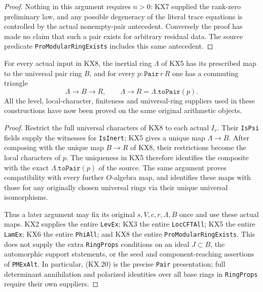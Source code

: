 \begin{proof}
Nothing in this argument requires $n>0$: KX7 supplied the
rank-zero preliminary law, and any possible degeneracy of the
literal trace equations is controlled by the actual nonempty-pair
antecedent.  Conversely the proof has made no claim that such
a pair exists for arbitrary residual data.  The source predicate
\texttt{ProModularRingExists} includes this same antecedent.
\end{proof}

\begin{corollary}
\label{claim:KX9}
For every actual input in KX8, the inertial ring $\Lambda$ of KX5
has its prescribed map to the universal pair ring $B$, and for
every $p:\texttt{Pair}\,r\,R$ one has a commuting triangle
\[
                    \Lambda\longrightarrow B\longrightarrow R,
 \qquad \Lambda\longrightarrow R
                         =\Lambda.\texttt{toPair}(p).
                                                               \tag{KX.22}
\]
All the level, local-character, finiteness and universal-ring
suppliers used in these constructions have now been proved on
the same original arithmetic objects.
\end{corollary}
\begin{proof}
Restrict the full universal characters of KX8 to each actual
$I_v$.  Their \texttt{IsPsi} fields supply the witnesses for
\texttt{IsInert}; KX5 gives a unique map $\Lambda\to B$.
After composing with the unique map $B\to R$ of KX8, their
restrictions become the local characters of $p$.  The uniqueness
in KX5 therefore identifies the composite with the exact
$\Lambda.\texttt{toPair}(p)$ of the source.  The same argument
proves compatibility with every further $O$-algebra map, and
identifies these maps with those for any originally chosen
universal rings via their unique universal isomorphisms.

Thus a later argument may fix its original $s,V,c,r,\Lambda,B$
once and use these actual maps.  KX2 supplies the entire
\texttt{LevEx}; KX3 the entire \texttt{LocCFTAll}; KX5 the
entire \texttt{LamEx}; KX6 the entire \texttt{PhiAll}; and KX8
the entire \texttt{ProModularRingExists}.
This does not supply the extra \texttt{RingProps} conditions
on an ideal $J\subset B$, the automorphic support statements,
or the seed and component-reaching assertions of \texttt{PMExAlt}.
In particular, (KX.20) is the precise \texttt{Pair} presentation;
full determinant annihilation and polarized identities over all
base rings in \texttt{RingProps} require their own suppliers.
\end{proof}
